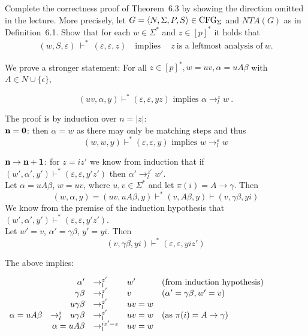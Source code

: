 \begin{exercise}{20}
      Complete the correctness proof of %
      Theorem~6.3 by showing the direction omitted in the lecture.
      More precisely, let $G = \langle N, \Sigma, P, S \rangle \in \textnormal{CFG}_{\Sigma}$ and $NTA(G)$ as in %
      Definition~6.1.
      Show that for each $w \in \Sigma^{*}$ and $z \in [p]^{*}$ it holds that
      \begin{align*}
         (w,S,\varepsilon) ~\vdash^{*}~ (\varepsilon,\varepsilon,z)  \quad\text{implies}~\quad z~\text{is a leftmost analysis of}~w.
      \end{align*}
\end{exercise}

\begin{solution}
We prove a stronger statement: For all $z \in [p]^*, w =uv, \alpha = uA\beta$ with $A \in N \cup \{\epsilon\}$,

$$(uv, \alpha, y) \vdash^* (\varepsilon, \varepsilon, yz) \text{ implies } \alpha \to_l^z w ~.$$

The proof is by induction over $n = |z|$:\\

$\bf{n=0}$: then $\alpha = w$ as there may only be matching steps and thus
$$(w, w, y) \vdash^* (\varepsilon, \varepsilon, y) \text{ implies } w \to_l^\varepsilon w$$

$\bf{n \to n+1}$: for $z = iz'$ we know from induction that if
	$(w', \alpha', y') \vdash^* (\varepsilon, \varepsilon, y'z')$
	then $\alpha' \to_l^{z'} w'$.\\

	Let $\alpha = uA\beta$, $w = uv$, where $u, v \in \Sigma^*$	and let $\pi(i) = A \to \gamma$.
    Then
    $$(w, \alpha, y) = (uv, uA\beta, y) \vdash^* (v, A\beta, y) \vdash (v, \gamma\beta, yi)$$
    We know from the premise of the induction hypothesis that $(w', \alpha', y') \vdash^* (\varepsilon, \varepsilon, y'z')$.\\
    Let $w'=v$, $\alpha'=\gamma\beta$, $y'=yi$.
    Then
    $$(v, \gamma\beta, yi) \vdash^* (\varepsilon, \varepsilon, yiz')$$

The above implies:
\begin{center}
$\begin{array}{rlrlll}
&& \alpha' &\to_l^{z'}& w' & \text{(from induction hypothesis)}\\
&& \gamma\beta &\to_l^{z'}& v & (\alpha'=\gamma\beta, w'=v) \\
&& u\gamma\beta &\to_l^{z'}& uv = w & \\
\alpha = uA\beta &\to^i_l& u\gamma\beta
 &\to_l^{z'}& uv = w & (\text{as }\pi(i) = A \to \gamma) \\
\multicolumn{3}{r}{\alpha = uA\beta} &\to_l^{iz'=z}& uv = w &
\end{array}$
\end{center}
\end{solution}

